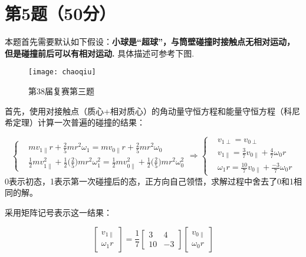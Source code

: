 \documentclass{ctexart}
\begin{document}
\section*{第5题（50分）}
\noindent 本题首先需要默认如下假设：\textbf{小球是“超球”，与筒壁碰撞时接触点无相对运动，但是碰撞前后可以有相对运动.} 具体描述可参考下图.\par
    \begin{figure}[htbp]
        \centering
        \texttt{[image: chaoqiu]}
        \caption*{第38届复赛第三题}
        \label{chaoqiu}
    \end{figure}
    首先，使用对接触点（质心+相对质心）的角动量守恒方程和能量守恒方程（科尼希定理）计算一次普遍的碰撞的结果：\par
    \begin{equation}
        \left\{
        \begin{aligned}
            &mv_{1\parallel}r+\frac{2}{5}mr^2 \omega_1=mv_{0\parallel}r+\frac{2}{5}mr^2 \omega_0\\
            &\frac{1}{2}mv_{1\parallel}^2+\frac{1}{2} \Big(\frac{2}{5}\Big)mr^2 \omega_1^2=\frac{1}{2}mv_{0\parallel}^2+\frac{1}{2} \Big(\frac{2}{5}\Big)mr^2 \omega_0^2
        \end{aligned}
        \right.
        \Rightarrow 
        \left\{
        \begin{aligned}
            &v_{1\perp}=v_{0\perp}\\
            &v_{1\parallel}=\frac{3}{7}v_{0\parallel}+\frac{4}{7}\omega_0r\\
            &\omega_{1}r=\frac{10}{7}v_{0\parallel}+\frac{-3}{7}\omega_0r
        \end{aligned}
        \right. \tag{5.1}
    \end{equation}
    0表示初态，1表示第一次碰撞后的态，正方向自己领悟，求解过程中舍去了0和1相同的解。\par
    采用矩阵记号表示这一结果：\par
    \begin{equation}
        \begin{bmatrix}
            v_{1\parallel} \\
            \omega_1r
        \end{bmatrix}
        =\frac{1}{7}
        \begin{bmatrix}
            3 & 4 \\
            10 & -3 
        \end{bmatrix}
        \begin{bmatrix}
            v_{0\parallel} \\
            \omega_0r
        \end{bmatrix}\tag{5.2}
    \end{equation}
\end{document}
